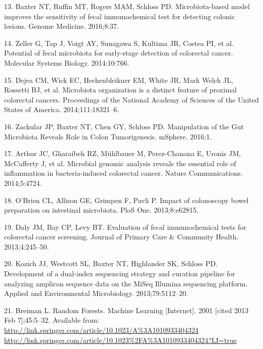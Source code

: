 \documentclass[12pt,]{article}
\begin{document}
\hypertarget{ref-baxter_microbiota-based_2016}{}
13. Baxter NT, Ruffin MT, Rogers MAM, Schloss PD. Microbiota-based model
improves the sensitivity of fecal immunochemical test for detecting
colonic lesions. Genome Medicine. 2016;8:37.

\hypertarget{ref-zeller_potential_2014}{}
14. Zeller G, Tap J, Voigt AY, Sunagawa S, Kultima JR, Costea PI, et al.
Potential of fecal microbiota for early-stage detection of colorectal
cancer. Molecular Systems Biology. 2014;10:766.

\hypertarget{ref-dejea_microbiota_2014}{}
15. Dejea CM, Wick EC, Hechenbleikner EM, White JR, Mark Welch JL,
Rossetti BJ, et al. Microbiota organization is a distinct feature of
proximal colorectal cancers. Proceedings of the National Academy of
Sciences of the United States of America. 2014;111:18321--6.

\hypertarget{ref-zackular_manipulation_2016}{}
16. Zackular JP, Baxter NT, Chen GY, Schloss PD. Manipulation of the Gut
Microbiota Reveals Role in Colon Tumorigenesis. mSphere. 2016;1.

\hypertarget{ref-arthur_microbial_2014}{}
17. Arthur JC, Gharaibeh RZ, Mühlbauer M, Perez-Chanona E, Uronis JM,
McCafferty J, et al. Microbial genomic analysis reveals the essential
role of inflammation in bacteria-induced colorectal cancer. Nature
Communications. 2014;5:4724.

\hypertarget{ref-obrien_impact_2013}{}
18. O'Brien CL, Allison GE, Grimpen F, Pavli P. Impact of colonoscopy
bowel preparation on intestinal microbiota. PloS One. 2013;8:e62815.

\hypertarget{ref-daly_evaluation_2013}{}
19. Daly JM, Bay CP, Levy BT. Evaluation of fecal immunochemical tests
for colorectal cancer screening. Journal of Primary Care \& Community
Health. 2013;4:245--50.

\hypertarget{ref-kozich_development_2013}{}
20. Kozich JJ, Westcott SL, Baxter NT, Highlander SK, Schloss PD.
Development of a dual-index sequencing strategy and curation pipeline
for analyzing amplicon sequence data on the MiSeq Illumina sequencing
platform. Applied and Environmental Microbiology. 2013;79:5112--20.

\hypertarget{ref-breiman_random_2001}{}
21. Breiman L. Random Forests. Machine Learning {[}Internet{]}. 2001
{[}cited 2013 Feb 7{]};45:5--32. Available from:
\href{http://link.springer.com/article/10.1023/A\%3A1010933404324\%20http://link.springer.com/article/10.1023\%2FA\%3A1010933404324?LI=true}{http://link.springer.com/article/10.1023/A\%3A1010933404324 http://link.springer.com/article/10.1023\%2FA\%3A1010933404324?LI=true}
\end{document}

